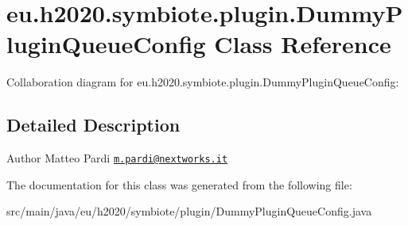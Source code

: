 \hypertarget{classeu_1_1h2020_1_1symbiote_1_1plugin_1_1DummyPluginQueueConfig}{}\section{eu.\+h2020.\+symbiote.\+plugin.\+Dummy\+Plugin\+Queue\+Config Class Reference}
\label{classeu_1_1h2020_1_1symbiote_1_1plugin_1_1DummyPluginQueueConfig}


Collaboration diagram for eu.\+h2020.\+symbiote.\+plugin.\+Dummy\+Plugin\+Queue\+Config\+:


\subsection{Detailed Description}
\begin{DoxyAuthor}{Author}
Matteo Pardi \href{mailto:m.pardi@nextworks.it}{\tt m.\+pardi@nextworks.\+it} 
\end{DoxyAuthor}


The documentation for this class was generated from the following file\+:\begin{DoxyCompactItemize}
\item 
src/main/java/eu/h2020/symbiote/plugin/Dummy\+Plugin\+Queue\+Config.\+java\end{DoxyCompactItemize}
